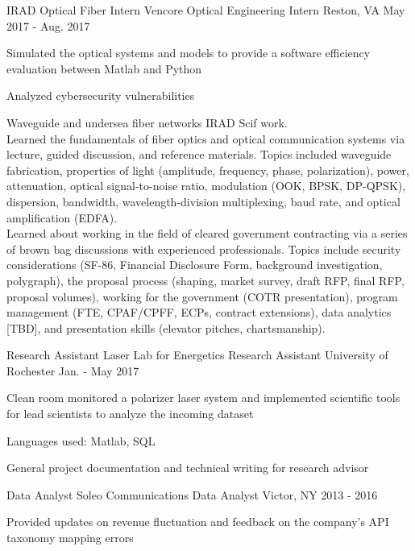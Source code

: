 \begin{cventries}
  \cventry
    {IRAD Optical Fiber Intern}
    {Vencore Optical Engineering Intern}
    {Reston, VA}
    {May 2017 - Aug. 2017}
    {
      \begin{cvitems}
        \item {Simulated the optical systems and models to provide a software efficiency evaluation between Matlab and Python}
        \item{Analyzed cybersecurity vulnerabilities }
        \item{Waveguide and undersea fiber networks IRAD Scif work. \\Learned the fundamentals of fiber optics and optical communication
    systems via lecture, guided discussion, and reference materials. Topics
    included waveguide fabrication, properties of light (amplitude,
    frequency, phase, polarization), power, attenuation, optical
    signal-to-noise ratio, modulation (OOK, BPSK, DP-QPSK), dispersion,
    bandwidth, wavelength-division multiplexing, baud rate, and optical
    amplification (EDFA). \\ Learned about working in the field of cleared government contracting
    via a series of brown bag discussions with experienced professionals.
    Topics include security considerations (SF-86, Financial Disclosure
    Form, background investigation, polygraph), the proposal process
    (shaping, market survey, draft RFP, final RFP, proposal volumes),
    working for the government (COTR presentation), program
    management (FTE, CPAF/CPFF, ECPs, contract extensions), data
    analytics [TBD], and presentation skills (elevator pitches,
    chartsmanship). }
      \end{cvitems}
    }
  \cventry
    {Research Assistant}
    {Laser Lab for Energetics Research Assistant}
    {University of Rochester}
    {Jan. - May 2017}
    {
      \begin{cvitems}
        \item {Clean room monitored a polarizer laser system and implemented scientific tools for lead scientists to analyze the incoming dataset}
        \item {Languages used: Matlab, SQL}
        \item {General project documentation and technical writing for research advisor}
      \end{cvitems}
    }
  \cventry
    {Data Analyst}
    {Soleo Communications Data Analyst}
    {Victor, NY}
    {2013 - 2016}
    {
      \begin{cvitems}
        \item {Provided updates on revenue fluctuation and feedback on the company's API taxonomy mapping errors}

\end{cvitems}}
\end{cventries}
